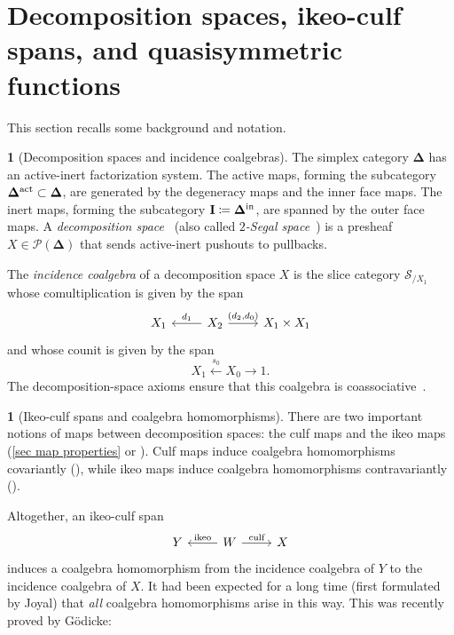 \documentclass{amsart}
\newcommand{\inert}{\mathbf{I}}
\newcommand{\simpl}{\mathbf{\Delta}}
\newcommand{\spaces}{\mathcal{S}}
\newcommand{\actrm}{\textup{act}}
\newcommand{\intrm}{\textup{in}}
\newcommand{\pre}{\mathcal{P}}
\theoremstyle{definition}
\theoremstyle{noname}
\newtheorem{blanko}[theorem]{}
\begin{document}
\section{Decomposition spaces, ikeo-culf spans, and quasisymmetric functions}\label{sec decomp ikeo culf q}

This section recalls some background and notation.

\begin{blanko}[Decomposition spaces and incidence coalgebras]
  The simplex category $\simpl$ has an active-inert factorization system.
  The active maps, forming the subcategory $\simpl^\actrm \subset \simpl$, are 
  generated by the degeneracy maps and the inner face maps. The inert maps,
  forming the subcategory $\inert \coloneq \simpl^\intrm$, are spanned by the outer face maps.
  A {\em decomposition space}~\cite{GKT1} (also called {\em $2$-Segal 
  space}~\cite{DyckerhoffKapranov:HSS})
  is a presheaf $X\in \pre(\simpl)$ that sends
  active-inert pushouts to pullbacks.

  
  The {\em incidence coalgebra} of a decomposition space $X$ is the slice category
  $\spaces_{/X_1}$ whose comultiplication is given by the span
\[ \begin{tikzcd}
X_1 & \lar[swap]{d_1} X_2 \rar{(d_2,d_0)} & X_1 \times X_1
\end{tikzcd} \]
  and whose counit is given by the span
  $$
  X_1 \stackrel{s_0}\leftarrow X_0 \to 1.
  $$
  The decomposition-space axioms ensure that this coalgebra is 
  coassociative~\cite{GKT1}.
\end{blanko}



\begin{blanko}[Ikeo-culf spans and coalgebra homomorphisms]\label{culf+ikeo}
There are two important notions of maps between decomposition spaces: the culf maps and the ikeo maps (\cref{sec map properties} or \cite{GKT1}). 
Culf maps induce coalgebra homomorphisms
  covariantly (\cite[Lemma~8.2]{GKT1}), while ikeo maps induce coalgebra homomorphisms contravariantly (\cite[Proposition~8.6]{GKT1}).

  Altogether, an ikeo-culf span
\[ \begin{tikzcd}
Y  & \lar["\text{ikeo}"']  W \rar["\text{culf}"] &  X
\end{tikzcd} \]
  induces a coalgebra homomorphism from the incidence coalgebra of $Y$ to the 
  incidence coalgebra of $X$.
It had been expected for a long time
  (first formulated by Joyal) that {\em all} coalgebra homomorphisms arise in this way. 
This was recently proved by G\"odicke:
\end{blanko}
\end{document}
